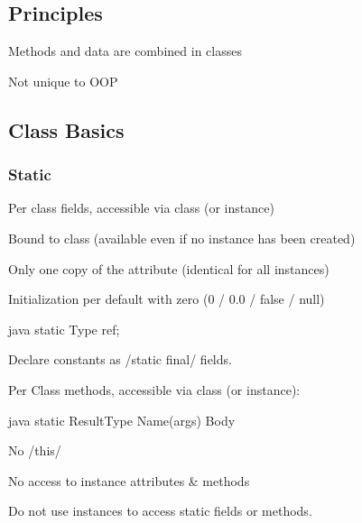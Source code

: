 \subsection{Principles}
\begin{defnbox}\nospacing
  \begin{defn}[Encapsulation]\label{defn:encapsulation}\leavevmode
    \begin{itemizenosep}
      \item Methods and data are combined in classes
      \item Not unique to OOP
    \end{itemizenosep}
  \end{defn}
\end{defnbox}
\subsection{Class Basics}
\subsubsection{Static}
\label{subsubsec:Static}
\begin{defnbox}\nospacing
  \begin{defn}\label{defn:staticFields}
    Per class fields, accessible via class (or instance)
    \begin{itemizenosep}
        \item Bound to class (available even if no instance has been created)
        \item Only one copy of the attribute (identical for all instances)
        \item Initialization per default with zero (0 / 0.0 / false / null) 
    \end{itemizenosep}
    \begin{mintlinebox}{java}
      static Type ref;
    \end{mintlinebox}
  \end{defn}
\end{defnbox}
\begin{stylebox}[Constants]\nospacing
  Declare constants as \javainline/static final/ fields.
\end{stylebox}
\begin{defnbox}\nospacing
  \begin{defn}\label{defn:staticFields}
    Per Class methods, accessible via class (or instance):
    \begin{mintlinebox}{java}
      static ResultType Name(args){ Body }
    \end{mintlinebox}
    \begin{itemizenosep}
        \item No \javainline/this/
        \item No access to instance attributes \& methods
    \end{itemizenosep}
  \end{defn}
\end{defnbox}
\begin{stylebox}\nospacing
  Do not use instances to access static fields or methods.
\end{stylebox}

